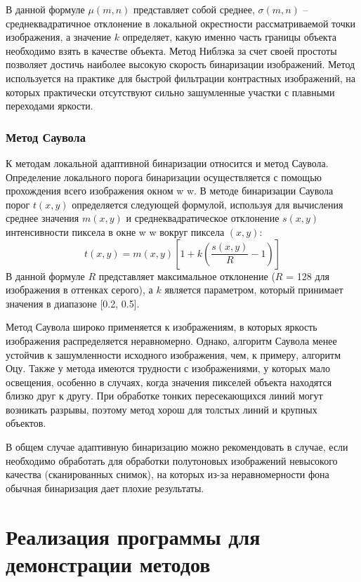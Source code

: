 \documentclass[a4paper,12pt]{article}
\begin{document}
В данной формуле $\mu (m,n)$ представляет собой среднее, $\sigma (m, n)$ – среднеквадратичное
отклонение в локальной окрестности рассматриваемой точки изображения, а значение $k$
определяет, какую именно часть границы объекта необходимо взять в качестве объекта.
Метод Ниблэка за счет своей простоты позволяет достичь наиболее высокую скорость
бинаризации изображений. Метод используется на практике для быстрой фильтрации
контрастных изображений, на которых практически отсутствуют сильно зашумленные участки
с плавными переходами яркости.

\subsubsection*{Метод Саувола}
К методам локальной адаптивной бинаризации относится и метод Саувола. Определение
локального порога бинаризации осуществляется с помощью прохождения всего изображения
окном w w. В методе бинаризации Саувола порог $t(x,y)$ определяется следующей формулой,
используя для вычисления среднее значения $m(x, y)$ и среднеквадратическое отклонение $s(x, y)$
интенсивности пиксела в окне w w вокруг пиксела $(x, y)$:
\begin{equation}
    t(x,y) = m(x,y)\left[1 + k\left(\frac{s(x,y)}{R} - 1\right)\right]
\end{equation}
В данной формуле $R$ представляет максимальное отклонение ($R$ = 128 для изображения в
оттенках серого), а $k$ является параметром, который принимает значения в диапазоне [0.2, 0.5].

Метод Саувола широко применяется к изображениям, в которых яркость изображения
распределяется неравномерно. Однако, алгоритм Саувола менее устойчив к зашумленности
исходного изображения, чем, к примеру, алгоритм Оцу. Также у метода имеются трудности с
изображениями, у которых мало освещения, особенно в случаях, когда значения пикселей
объекта находятся близко друг к другу. При обработке тонких пересекающихся линий могут
возникать разрывы, поэтому метод хорош для толстых линий и крупных объектов.
\vspace{1.3cm}

В общем случае адаптивную бинаризацию можно рекомендовать в случае, если необходимо
обработать для обработки полутоновых изображений невысокого качества (сканированных снимок),
на которых из-за неравномерности фона обычная бинаризация дает плохие результаты. 

\section{Реализация программы для демонстрации методов}
\end{document}
